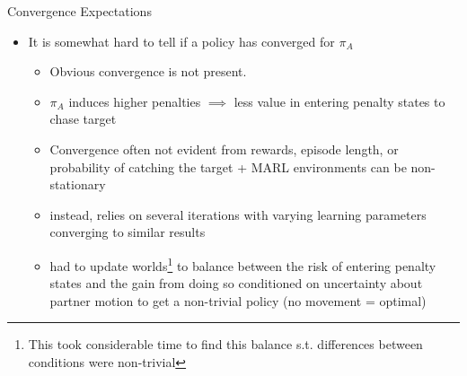 \documentclass[aspectratio=1610, xcolor=dvipsnames]{packages/beamer}
\begin{document}
\begin{frame}{Convergence Expectations}
    \begin{itemize}
        \item It is somewhat hard to tell if a policy has converged for $\pi_A$
        \begin{itemize}
            \item Obvious convergence is not present.
            \item $\pi_A$ induces higher penalties $\implies$ less value in entering penalty states to chase target
            \item Convergence often not evident from rewards, episode length, or probability of catching the target + MARL environments can be non-stationary
            \item instead, relies on several iterations with varying learning parameters converging to similar results
            \item had to update worlds\footnote{This took considerable time to find this balance s.t. differences between conditions were non-trivial} to balance between the risk of entering penalty states and the gain from doing so conditioned on uncertainty about partner motion to get a non-trivial policy (no movement = optimal)
        \end{itemize}
    \end{itemize}
\end{frame}


\newcommand{\Wfig}{0.48}
\end{document}
